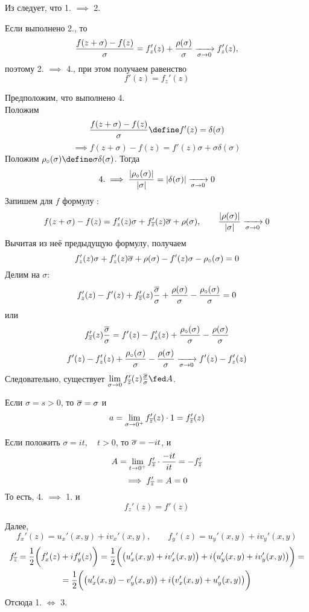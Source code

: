 \begin{iproof}
	\item Из  следует, что 1. $ \implies $ 2.
	\item Если выполнено 2., то
	$$ \frac{f(z + \sigma) - f(z)}\sigma = f_z'(z) + \frac{\rho(\sigma)}\sigma \xrightarrow[\sigma \to 0]{} f_z'(z), $$
	поэтому 2. $ \implies $ 4., при этом получаем равенство
	$$ f'(z) = f_z'(z) $$
	\item Предположим, что выполнено 4. \\
	Положим
	$$ \frac{f(z + \sigma) - f(z)}\sigma \define f'(z) = \delta(\sigma) $$
	$$ \implies f(z + \sigma) - f(z) = f'(z) \sigma + \sigma \delta(\sigma) $$
	Положим $ \rho_\circ(\sigma) \define \sigma\delta(\sigma) $. Тогда
	$$ 4. \implies \frac{|\rho_\circ(\sigma)|}{|\sigma|} = |\delta(\sigma)| \xrightarrow[\sigma \to 0]{} 0 $$
	Запишем для $ f $ формулу :
	$$ f(z + \sigma) - f(z) = f_z'(z)\sigma + f_{\overline z}'(z) \overline \sigma + \rho(\sigma), \qquad \frac{|\rho(\sigma)|}{|\sigma|} \xrightarrow[\sigma \to 0]{} 0 $$
	Вычитая из неё предыдущую формулу, получаем
	$$ f_z'(z) \sigma + f_z' (z) \overline \sigma + \rho(\sigma) - f'(z)\sigma - \rho_\circ(\sigma) = 0 $$
	Делим на $ \sigma $:
	$$ f_z'(z) - f'(z) + f_{\overline z}'(z) \frac{\overline \sigma}\sigma + \frac{\rho(\sigma)}\sigma - \frac{\rho_\circ(\sigma)}\sigma = 0 $$
	или
	$$ f_{\overline z}'(z) \frac{\overline \sigma}\sigma = f'(z) - f_z'(z) + \frac{\rho_\circ(\sigma)}\sigma - \frac{\rho(\sigma)}\sigma $$
	$$ f'(z) - f_z'(z) + \frac{\rho_\circ(\sigma)}\sigma - \frac{\rho(\sigma)}\sigma \xrightarrow[\sigma \to 0]{} f'(z) - f_z'(z) $$
	Следовательно, существует $ \limz\sigma f_{\ol z}'(z) \frac{\ol \sigma}\sigma \fed A $.

	Если $ \sigma = s > 0 $, то $ \overline \sigma = \sigma $ и
	$$ a = \lim\limits_{\sigma \to 0^+} f_{\overline z}'(z) \cdot 1 = f_{\overline z}'(z) $$

	Если положить $ \sigma = it, \quad t > 0 $, то $ \overline \sigma = -it $, и
	$$ A = \lim\limits_{t \to 0^+} f_{\overline z}' \cdot \frac{-it}{it} = -f_{\overline z}' $$
	$$ \implies f_{\overline z}' = A = 0 $$
	То есть, 4. $ \implies $ 1. и
	$$ f_z'(z) = f'(z) $$

	\item Далее,
	$$ f_x'(z) = u_x'(x, y) + iv_x'(x, y), \qquad f_y'(z) = u_y'(x, y) + iv_y'(x, y) $$
	\begin{multline*}
		f_{\overline z}' = \frac12 \bigg( f_x'(z) + if_y'(z) \bigg) = \frac12 \bigg( \big( u_x'(x, y) + iv_x'(x, y) \big) + i \big( u_y'(x, y) + iv_y'(x, y) \big) \bigg) = \\
		= \frac12 \bigg( \big( u_x'(x, y) - v_y'(x, y) \big) + i \big( v_x'(x, y) + u_y'(x, y) \big) \bigg)
	\end{multline*}
	Отсюда 1. $ \iff $ 3.
\end{iproof}

